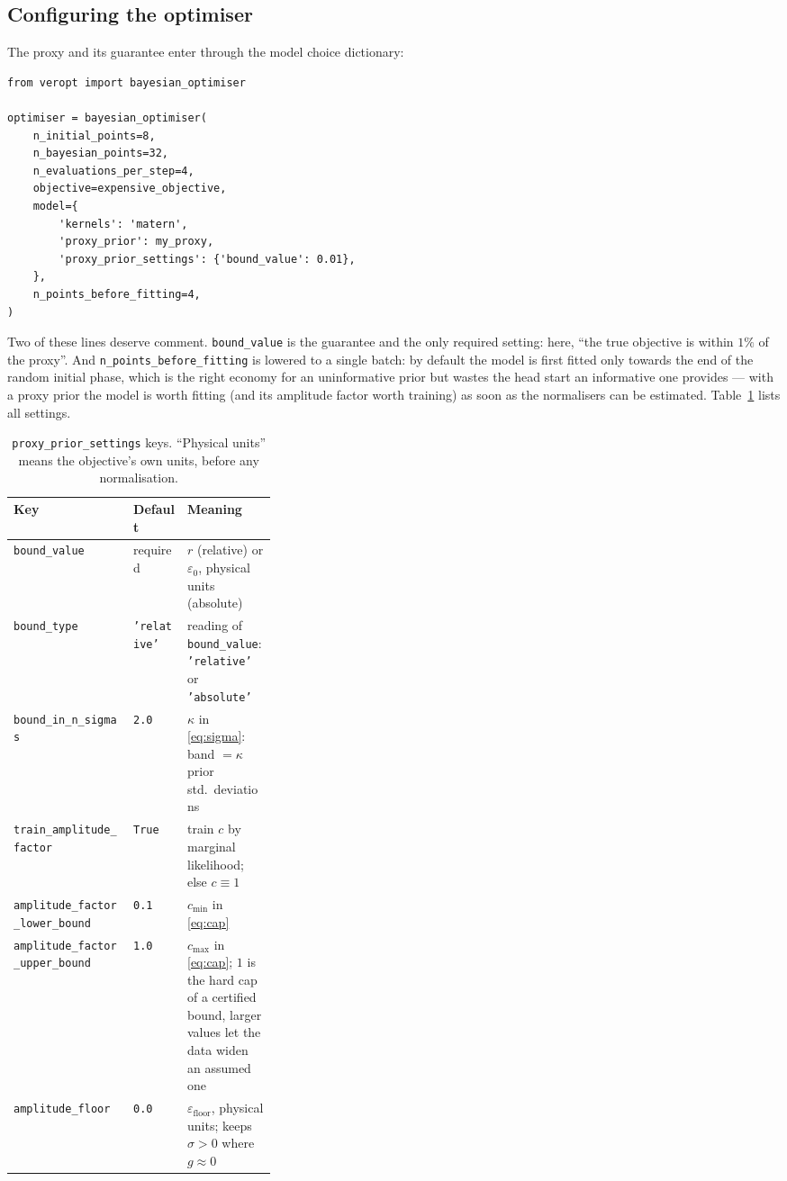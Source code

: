 \documentclass[11pt,a4paper]{article}
\newcommand{\code}[1]{\texttt{#1}}
\begin{document}
\subsection{Configuring the optimiser}

The proxy and its guarantee enter through the model choice dictionary:

\begin{lstlisting}
from veropt import bayesian_optimiser

optimiser = bayesian_optimiser(
    n_initial_points=8,
    n_bayesian_points=32,
    n_evaluations_per_step=4,
    objective=expensive_objective,
    model={
        'kernels': 'matern',
        'proxy_prior': my_proxy,
        'proxy_prior_settings': {'bound_value': 0.01},
    },
    n_points_before_fitting=4,
)
\end{lstlisting}

Two of these lines deserve comment. \code{bound\_value} is the guarantee and
the only required setting: here, ``the true objective is within $1\%$ of the
proxy''. And \code{n\_points\_before\_fitting} is lowered to a single batch:
by default the model is first fitted only towards the end of the random
initial phase, which is the right economy for an uninformative prior but
wastes the head start an informative one provides --- with a proxy prior the
model is worth fitting (and its amplitude factor worth training) as soon as
the normalisers can be estimated. Table~\ref{tab:settings} lists all
settings.

\begin{table}[t]
  \centering
  \caption{\code{proxy\_prior\_settings} keys. ``Physical units'' means the
  objective's own units, before any normalisation.}
  \label{tab:settings}
  \small
  \begin{tabular}{llp{0.34\linewidth}}
    \toprule
    Key & Default & Meaning \\
    \midrule
    \code{bound\_value} & required &
      $r$ (relative) or $\varepsilon_0$, physical units (absolute) \\
    \code{bound\_type} & \code{'relative'} &
      reading of \code{bound\_value}: \code{'relative'} or \code{'absolute'} \\
    \code{bound\_in\_n\_sigmas} & \code{2.0} &
      $\kappa$ in \eqref{eq:sigma}: band $=\kappa$ prior std.\ deviations \\
    \code{train\_amplitude\_factor} & \code{True} &
      train $c$ by marginal likelihood; else $c \equiv 1$ \\
    \code{amplitude\_factor\_lower\_bound} & \code{0.1} &
      $c_{\min}$ in \eqref{eq:cap} \\
    \code{amplitude\_factor\_upper\_bound} & \code{1.0} &
      $c_{\max}$ in \eqref{eq:cap}; $1$ is the hard cap of a certified
      bound, larger values let the data widen an assumed one \\
    \code{amplitude\_floor} & \code{0.0} &
      $\varepsilon_{\mathrm{floor}}$, physical units; keeps $\sigma > 0$
      where $g \approx 0$ \\
    \bottomrule
  \end{tabular}
\end{table}
\end{document}
